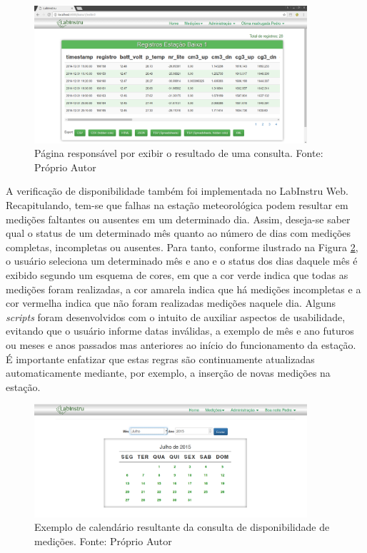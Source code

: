 \begin{figure}[h!]
	\centering
	\includegraphics[width=0.9\textwidth]{./img/ap7.png}
	\caption{Página responsável por exibir o resultado de uma consulta. Fonte: Próprio Autor} \label{fig:ap7}
\end{figure}

A verificação de disponibilidade também foi implementada no LabInstru Web. Recapitulando, tem-se que falhas na estação meteorológica podem resultar em medições faltantes ou ausentes em um determinado dia. Assim, deseja-se saber qual o status de um determinado mês quanto ao número de dias com medições completas, incompletas ou ausentes. Para tanto, conforme ilustrado na Figura \ref{fig:consultaDisp}, o usuário seleciona um determinado mês e ano e o status dos dias daquele mês é exibido segundo um esquema de cores, em que a cor verde indica que todas as medições foram realizadas, a cor amarela indica que há medições incompletas e a cor vermelha indica que não foram realizadas medições naquele dia. Alguns \emph{scripts} foram desenvolvidos com o intuito de auxiliar aspectos de usabilidade, evitando que o usuário informe datas inválidas, a exemplo de mês e ano futuros ou meses e anos passados mas anteriores ao início do funcionamento da estação. É importante enfatizar que estas regras são continuamente atualizadas automaticamente mediante, por exemplo, a inserção de novas medições na estação.

\begin{figure}[h!]
	\centering
	\includegraphics[width=0.9\textwidth]{./img/disponibilidade2.png}
	\caption{Exemplo de calendário resultante da consulta de disponibilidade de medições. Fonte: Próprio Autor} \label{fig:consultaDisp}
\end{figure}
